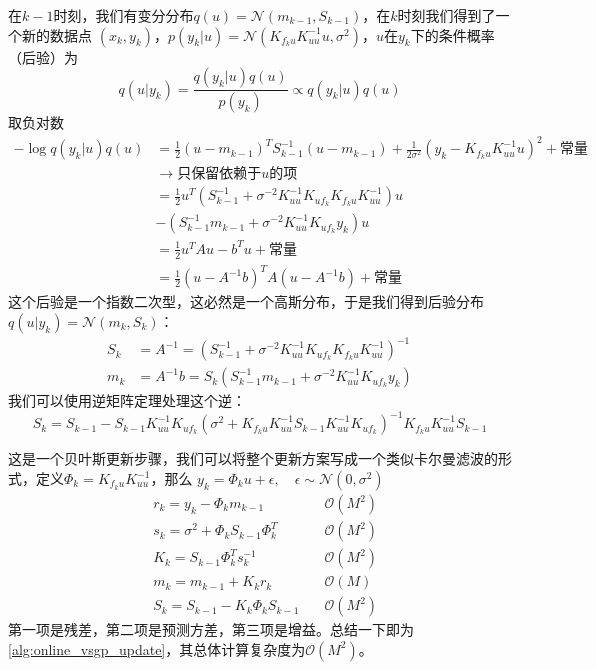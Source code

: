在$k-1$时刻，我们有变分分布$q(u) = \mathcal N (m_{k-1}, S_{k-1})$，在$k$时刻我们得到了一个新的数据点
$(x_k, y_k)$，$p(y_k | u) = \mathcal N(K_{f_k u} K_{uu}^{-1}u, \sigma^2)$，$u$在$y_k$下的条件概率（后验）为
\begin{equation}
    q(u|y_k) = \frac{q(y_k|u)q(u)}{p(y_k)} \propto q(y_k|u)q(u)
\end{equation}
取负对数
\begin{equation}
    \begin{aligned}
        - \log q(y_k|u)q(u)
        &= \frac{1}{2} (u - m_{k-1})^T S_{k-1}^{-1} (u - m_{k-1}) + \frac{1}{2\sigma^2} (y_k - K_{f_ku} K_{uu}^{-1} u)^2 + \text{常量} \\
        &\rightarrow \text{只保留依赖于} u \text{的项} \\
        &= \frac{1}{2} u^T (S_{k-1}^{-1} + \sigma^{-2} K_{u u}^{-1} K_{uf_k} K_{f_ku} K_{uu}^{-1}) u \\
        &- (S_{k-1}^{-1} m_{k-1} + \sigma^{-2} K_{uu}^{-1} K_{uf_k} y_k) u \\
        &= \frac{1}{2} u^T A u - b^T u + \text{常量} \\
        &= \frac{1}{2} (u - A^{-1} b)^T A (u - A^{-1} b) + \text{常量}
    \end{aligned}
\end{equation}
这个后验是一个指数二次型，这必然是一个高斯分布，于是我们得到后验分布$q(u|y_k) = \mathcal N(m_k, S_k)$：
\begin{equation}    
    \begin{aligned}
        S_k &= A^{-1} =  (S_{k-1}^{-1} + \sigma^{-2} K_{u u}^{-1} K_{u f_k} K_{f_k u} K_{u u}^{-1})^{-1} \\
        m_k &= A^{-1}b = S_k (S_{k-1}^{-1} m_{k-1} + \sigma^{-2} K_{u u}^{-1} K_{u f_k} y_k)
    \end{aligned}   
\end{equation}
我们可以使用逆矩阵定理处理这个逆：
\begin{equation}
    S_k = S_{k-1} - S_{k-1} K_{u u}^{-1} K_{u f_k} (\sigma^2 + K_{f_k u} K_{u u}^{-1} S_{k-1} K_{u u}^{-1} K_{u f_k})^{-1} K_{f_k u} K_{u u}^{-1} S_{k-1}
\end{equation}

这是一个贝叶斯更新步骤，我们可以将整个更新方案写成一个类似卡尔曼滤波的形式，定义$\Phi_k = K_{f_k u} K_{uu}^{-1}$，那么
$y_k = \Phi_k u + \epsilon, \quad \epsilon \sim \mathcal N(0, \sigma^2)$
\begin{equation}
    \begin{aligned}
        & r_k = y_k - \Phi_k m_{k-1} &\quad \mathcal O(M^2) \\
        & s_k = \sigma^2 + \Phi_k S_{k-1} \Phi_k^T &\quad \mathcal O(M^2) \\
        & K_k = S_{k-1} \Phi_k^T s_k^{-1} &\quad \mathcal O(M^2) \\
        & m_k = m_{k-1} + K_k r_k &\quad \mathcal O(M) \\
        & S_k = S_{k-1} - K_k \Phi_k S_{k-1} &\quad \mathcal O(M^2)
    \end{aligned}
\end{equation}
第一项是残差，第二项是预测方差，第三项是增益。总结一下即为\autoref{alg:online_vsgp_update}，其总体计算复杂度为$\mathcal O(M^2)$。


